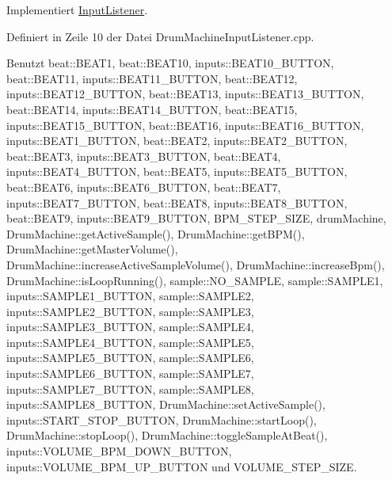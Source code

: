 Implementiert \hyperlink{class_input_listener_a1a3d74f2ffc108c773511ea4be250f7d}{Input\+Listener}.



Definiert in Zeile 10 der Datei Drum\+Machine\+Input\+Listener.\+cpp.



Benutzt beat\+::\+B\+E\+A\+T1, beat\+::\+B\+E\+A\+T10, inputs\+::\+B\+E\+A\+T10\+\_\+\+B\+U\+T\+T\+ON, beat\+::\+B\+E\+A\+T11, inputs\+::\+B\+E\+A\+T11\+\_\+\+B\+U\+T\+T\+ON, beat\+::\+B\+E\+A\+T12, inputs\+::\+B\+E\+A\+T12\+\_\+\+B\+U\+T\+T\+ON, beat\+::\+B\+E\+A\+T13, inputs\+::\+B\+E\+A\+T13\+\_\+\+B\+U\+T\+T\+ON, beat\+::\+B\+E\+A\+T14, inputs\+::\+B\+E\+A\+T14\+\_\+\+B\+U\+T\+T\+ON, beat\+::\+B\+E\+A\+T15, inputs\+::\+B\+E\+A\+T15\+\_\+\+B\+U\+T\+T\+ON, beat\+::\+B\+E\+A\+T16, inputs\+::\+B\+E\+A\+T16\+\_\+\+B\+U\+T\+T\+ON, inputs\+::\+B\+E\+A\+T1\+\_\+\+B\+U\+T\+T\+ON, beat\+::\+B\+E\+A\+T2, inputs\+::\+B\+E\+A\+T2\+\_\+\+B\+U\+T\+T\+ON, beat\+::\+B\+E\+A\+T3, inputs\+::\+B\+E\+A\+T3\+\_\+\+B\+U\+T\+T\+ON, beat\+::\+B\+E\+A\+T4, inputs\+::\+B\+E\+A\+T4\+\_\+\+B\+U\+T\+T\+ON, beat\+::\+B\+E\+A\+T5, inputs\+::\+B\+E\+A\+T5\+\_\+\+B\+U\+T\+T\+ON, beat\+::\+B\+E\+A\+T6, inputs\+::\+B\+E\+A\+T6\+\_\+\+B\+U\+T\+T\+ON, beat\+::\+B\+E\+A\+T7, inputs\+::\+B\+E\+A\+T7\+\_\+\+B\+U\+T\+T\+ON, beat\+::\+B\+E\+A\+T8, inputs\+::\+B\+E\+A\+T8\+\_\+\+B\+U\+T\+T\+ON, beat\+::\+B\+E\+A\+T9, inputs\+::\+B\+E\+A\+T9\+\_\+\+B\+U\+T\+T\+ON, B\+P\+M\+\_\+\+S\+T\+E\+P\+\_\+\+S\+I\+ZE, drum\+Machine, Drum\+Machine\+::get\+Active\+Sample(), Drum\+Machine\+::get\+B\+P\+M(), Drum\+Machine\+::get\+Master\+Volume(), Drum\+Machine\+::increase\+Active\+Sample\+Volume(), Drum\+Machine\+::increase\+Bpm(), Drum\+Machine\+::is\+Loop\+Running(), sample\+::\+N\+O\+\_\+\+S\+A\+M\+P\+LE, sample\+::\+S\+A\+M\+P\+L\+E1, inputs\+::\+S\+A\+M\+P\+L\+E1\+\_\+\+B\+U\+T\+T\+ON, sample\+::\+S\+A\+M\+P\+L\+E2, inputs\+::\+S\+A\+M\+P\+L\+E2\+\_\+\+B\+U\+T\+T\+ON, sample\+::\+S\+A\+M\+P\+L\+E3, inputs\+::\+S\+A\+M\+P\+L\+E3\+\_\+\+B\+U\+T\+T\+ON, sample\+::\+S\+A\+M\+P\+L\+E4, inputs\+::\+S\+A\+M\+P\+L\+E4\+\_\+\+B\+U\+T\+T\+ON, sample\+::\+S\+A\+M\+P\+L\+E5, inputs\+::\+S\+A\+M\+P\+L\+E5\+\_\+\+B\+U\+T\+T\+ON, sample\+::\+S\+A\+M\+P\+L\+E6, inputs\+::\+S\+A\+M\+P\+L\+E6\+\_\+\+B\+U\+T\+T\+ON, sample\+::\+S\+A\+M\+P\+L\+E7, inputs\+::\+S\+A\+M\+P\+L\+E7\+\_\+\+B\+U\+T\+T\+ON, sample\+::\+S\+A\+M\+P\+L\+E8, inputs\+::\+S\+A\+M\+P\+L\+E8\+\_\+\+B\+U\+T\+T\+ON, Drum\+Machine\+::set\+Active\+Sample(), inputs\+::\+S\+T\+A\+R\+T\+\_\+\+S\+T\+O\+P\+\_\+\+B\+U\+T\+T\+ON, Drum\+Machine\+::start\+Loop(), Drum\+Machine\+::stop\+Loop(), Drum\+Machine\+::toggle\+Sample\+At\+Beat(), inputs\+::\+V\+O\+L\+U\+M\+E\+\_\+\+B\+P\+M\+\_\+\+D\+O\+W\+N\+\_\+\+B\+U\+T\+T\+ON, inputs\+::\+V\+O\+L\+U\+M\+E\+\_\+\+B\+P\+M\+\_\+\+U\+P\+\_\+\+B\+U\+T\+T\+ON und V\+O\+L\+U\+M\+E\+\_\+\+S\+T\+E\+P\+\_\+\+S\+I\+ZE.



